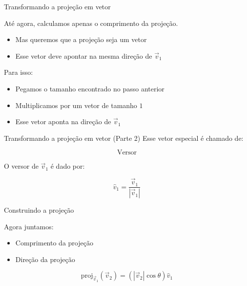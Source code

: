 \documentclass{beamer}
\begin{document}
\begin{frame}{Transformando a projeção em vetor}


\vspace{0.5cm}

Até agora, calculamos apenas o comprimento da projeção.

\begin{itemize}
    \item Mas queremos que a projeção seja um vetor
    \item Esse vetor deve apontar na mesma direção de $\vec{v}_1$
\end{itemize}


Para isso:

\begin{itemize}
    \item Pegamos o tamanho encontrado no passo anterior
    \item Multiplicamos por um vetor de tamanho $1$
    \item Esse vetor aponta na direção de $\vec{v}_1$
\end{itemize}

\vspace{0.6cm}

\end{frame}
\begin{frame}{Transformando a projeção em vetor (Parte 2)}
Esse vetor especial é chamado de:

\[
\boxed{\text{Versor}} 
\]

\vspace{0.5cm}

O versor de $\vec{v}_1$ é dado por:

\[
\hat{v}_1 = \frac{\vec{v}_1}{|\vec{v}_1|}
\]

\end{frame}
\begin{frame}{Construindo a projeção}


\vspace{0.5cm}

Agora juntamos:

\begin{itemize}
    \item Comprimento da projeção
    \item Direção da projeção
\end{itemize}

\vspace{0.5cm}

\[
\mathrm{proj}_{\vec{v}_1}(\vec{v}_2)
=
(|\vec{v}_2| \cos\theta)\hat{v}_1
\]

\end{frame}
\end{document}
